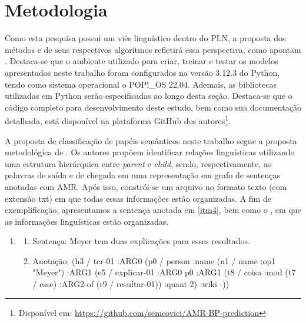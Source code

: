 \section{Metodologia}\label{sec-metologia}

Como esta pesquisa possui um viés linguístico dentro do PLN, a proposta
dos métodos e de seus respectivos algoritmos refletirá essa perspectiva,
como apontam \textcite{rodrigues2022}. Destaca-se que o ambiente
utilizado para criar, treinar e testar os modelos apresentados neste
trabalho foram configurados na versão 3.12.3 do Python, tendo como
sistema operacional o POP!\_OS 22.04. Ademais, as bibliotecas utilizadas
em Python serão especificadas ao longo desta seção. Destaca-se que o
código completo para desenvolvimento deste estudo, bem como sua
documentação detalhada, está disponível na plataforma GitHub dos
autores\footnote{Disponível em: \url{https://github.com/semcovici/AMR-BP-prediction}}.

A proposta de classificação de papéis semânticos neste trabalho segue a
proposta metodológica de \textcite{ilmy2021}. Os autores propõem
identificar relações linguísticas utilizando uma estrutura hierárquica
entre \emph{parent} e \emph{child}, sendo, respectivamente, as palavras
de saída e de chegada em uma representação em grafo de sentenças
anotadas com AMR. Após isso, constrói-se um arquivo no formato texto
(com extensão txt) em que todas essas informações estão organizadas. A
fim de exemplificação, apresentamos a sentença anotada em \ref{itm4}, bem como
o , em que as informações linguísticas estão organizadas.

\begin{enumerate}[start=4,label={(\arabic{enumi})}]
  \item\label{itm4}
    \begin{enumerate}[label=(\arabic{enumi}.\alph*)]
      \item\label{itm4a} Sentença: Meyer tem duas explicações para esses resultados.
      \item\label{itm4b} Anotação: (h3 / ter-01 :ARG0 (p0 / person :name (n1 / name :op1
  "Meyer") :ARG1 (e5 / explicar-01 :ARG0 p0 :ARG1 (t8 / coisa :mod (t7 /
  esse) :ARG2-of (r9 / resultar-01)) :quant 2) :wiki -))
    \end{enumerate}
\end{enumerate}


